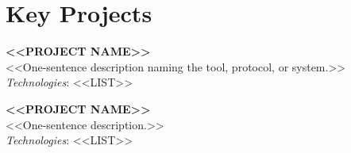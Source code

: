 \documentclass[10pt,a4paper]{article}
\newlength{\rightcolwidth}
\begin{document}
\begin{minipage}[t]{\rightcolwidth}
\section{Key Projects}

\textbf{<<PROJECT NAME>>}\\
<<One-sentence description naming the tool, protocol, or system.>>\\
\textit{Technologies}: <<LIST>>

\vspace{4pt}

\textbf{<<PROJECT NAME>>}\\
<<One-sentence description.>>\\
\textit{Technologies}: <<LIST>>

\end{minipage}
\end{document}
